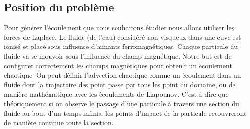 \documentclass[a4paper,12pt,titlepage]{report}
\begin{document}
\begin{onehalfspace}

\chapter{Position du problème}

Pour générer l'écoulement que nous souhaitons étudier nous allons utiliser les forces de Laplace. Le fluide (de l'eau) considéré non visqueux dans une cuve est ionisé et placé sous influence d'aimants ferromagnétiques. Chaque particule du fluide va se mouvoir sous l'influence du champ magnétique. Notre but est de configurer correctement les champs magnétiques pour obtenir un écoulement chaotique. On peut définir l'advection chaotique comme un écoulement dans un fluide dont la trajectoire des point passe par tous les point du domaine, ou de manière mathématique avec les écoulements de Liapounov.
C'est à dire que théoriquement si on observe le passage d'une particule à travers une section du fluide au bout d'un temps infinis, les points d'impact de la particule recouvreront de manière continue toute la section.

\end{onehalfspace}
\end{document}
